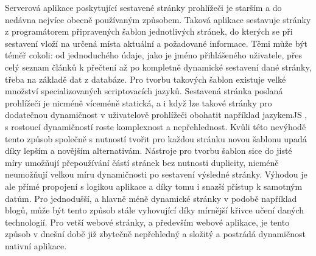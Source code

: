 	Serverová aplikace poskytující sestavené stránky prohlížeči je starším a do nedávna nejvíce obecně používaným způsobem.
	Taková aplikace sestavuje stránky z programátorem připravených šablon jednotlivých stránek, do kterých se při sestavení
	vloží na určená místa aktuální a požadované informace.
	Těmi může být téměř cokoli: od jednoduchého údaje, jako je jméno přihlášeného uživatele, přes celý seznam článků k přečtení
	až po kompletně dynamické sestavení dané stránky, třeba na základě dat z databáze.
	Pro tvorbu takových šablon existuje velké množství specializovaných scriptovacích jazyků.
	Sestavená stránka poslaná prohlížeči je nicméně víceméně statická, a i když lze takové stránky pro dodatečnou
	dynamičnost v uživatelově prohlížeči obohatit například jazykem\ac{JS} , s rostoucí dynamičností roste komplexnost a nepřehlednost.
	Kvůli této nevýhodě tento způsob společně s nutností tvořit pro každou stránku novou šablonu upadá díky lepším a novějším
	alternativám.
	Nástroje pro tvorbu šablon sice do jisté míry umožňují přepoužívání částí stránek bez nutnosti duplicity,
	nicméně neumožňují velkou míru dynamičnosti po sestavení výsledné stránky.
	Výhodou je ale přímé propojení s logikou aplikace a díky tomu i snazší přístup k samotným datům.
	Pro jednodušší, a hlavně méně dynamické stránky v podobě například blogů, může být tento způsob stále vyhovující díky
	mírnější křivce učení daných technologií.
	Pro vetší webové stránky, a především webové aplikace, je tento způsob v dnešní době již zbytečně nepřehledný a složitý a
	postrádá dynamičnost nativní aplikace.

